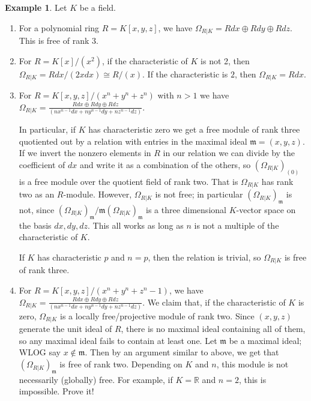 \documentclass{amsart}[12pt]
\newcommand{\R}{{\mathbb{R}}}
\newcommand{\Z}{\mathbb{Z}}
\newcommand{\fm}{{\mathfrak m}}
\numberwithin{equation}{section}
\theoremstyle{plain} %
\theoremstyle{definition}
\newtheorem{ex}[equation]{Example}
\theoremstyle{remark}
\begin{document}
\begin{ex} Let $K$ be a field.
\begin{enumerate}
\item For a polynomial ring $R=K[x,y,z]$, we have $\Omega_{R|K} = R dx \oplus R dy \oplus R dz$. This is free of rank $3$.
\item For $R=K[x]/(x^2)$, if the characteristic of $K$ is not 2, then $\Omega_{R|K}=R dx / (2x dx) \cong R/(x)$. If the characteristic is $2$, then $\Omega_{R|K}=R dx$. 
\item For $R=K[x,y,z]/(x^n+y^n+z^n)$ with $n>1$ we have $\displaystyle \Omega_{R|K} = \frac{R dx \oplus R dy \oplus R dz}{(n x^{n-1} dx + n y^{n-1} dy + n z^{n-1} dz)}$. 

In particular, if $K$ has characteristic zero we get a free module of rank three quotiented out by a relation with entries in the maximal ideal $\fm=(x,y,z)$. If we invert the nonzero elements in $R$ in our relation we can divide by the coefficient of $dx$ and write it as a combination of the others, so $ (\Omega_{R|K})_{(0)}$ is a free module over the quotient field of rank two. That is $\Omega_{R|K}$ has rank two as an $R$-module. However, $\Omega_{R|K}$ is not free; in particular $(\Omega_{R|K})_\fm$ is not, since $\displaystyle (\Omega_{R|K})_\fm / \fm (\Omega_{R|K})_\fm$ is a three dimensional $K$-vector space on the basis $dx,dy,dz$. This all works as long as $n$ is not a multiple of the characteristic of $K$.

If $K$ has characteristic $p$ and $n=p$, then the relation is trivial, so $\Omega_{R|K}$ is free of rank three.

\item For $R=K[x,y,z]/(x^n+y^n+z^n-1)$, we have $\Omega_{R|K} = \displaystyle \frac{R dx \oplus R dy \oplus R dz}{(n x^{n-1} dx + n y^{n-1} dy + n z^{n-1} dz)}$. We claim that, if the characteristic of $K$ is zero, $\Omega_{R|K}$ is a locally free/projective module of rank two. Since $(x,y,z)$ generate the unit ideal of $R$, there is no maximal ideal containing all of them, so any maximal ideal fails to contain at least one. Let $\fm$ be a maximal ideal; WLOG say $x\notin \fm$. Then by an argument similar to above, we get that $(\Omega_{R|K})_\fm$ is free of rank two. Depending on $K$ and $n$, this module is not necessarily (globally) free. For example, if $K=\R$ and $n=2$, this is impossible. Prove it! 

\end{enumerate}
\end{ex}
\end{document}
